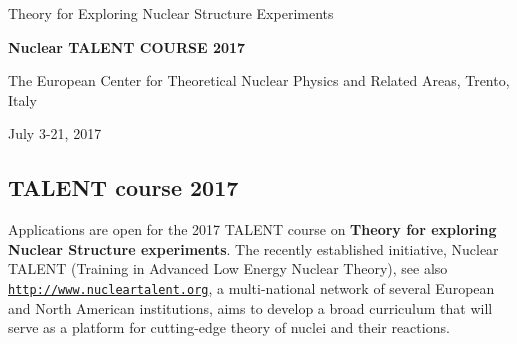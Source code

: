 \documentclass[%
oneside,                 %
final,                   %
10pt]{article}
\begin{document}

\newcommand{\exercisesection}[1]{\subsection*{#1}}






\thispagestyle{empty}

\begin{center}
{\LARGE\bf
\begin{spacing}{1.25}
Theory for Exploring Nuclear Structure Experiments
\end{spacing}
}
\end{center}


\begin{center}
{\bf Nuclear TALENT COURSE 2017}
\end{center}

    \begin{center}
\centerline{{\small The European Center for Theoretical Nuclear Physics and Related Areas, Trento, Italy}}
\end{center}
    

\begin{center}
July 3-21, 2017
\end{center}

\vspace{1cm}


\subsection*{TALENT course 2017}

Applications are open for the 2017 TALENT course on 
\textbf{Theory for exploring Nuclear Structure experiments}.  The recently established
initiative, Nuclear TALENT (Training in Advanced Low Energy Nuclear Theory), 
see also \href{{http://www.nucleartalent.org}}{\nolinkurl{http://www.nucleartalent.org}}, a multi-national network of
several European and North American institutions, aims to develop a
broad curriculum that will serve as a platform for cutting-edge theory
of nuclei and their reactions.
\end{document}
